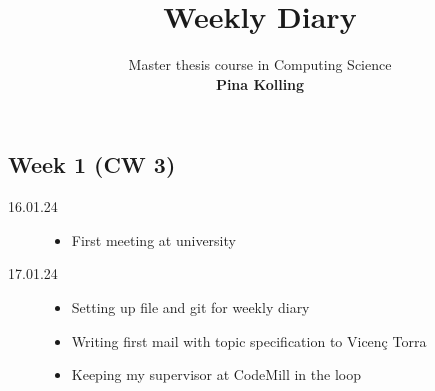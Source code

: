 \documentclass[a4]{scrartcl}
\begin{document}
	
	\title{\vspace{-5ex} Weekly Diary}
	\author{
		Master thesis course in Computing Science \\
		\textbf{Pina Kolling}
	}
	\date{\vspace{-5ex}}
	
	\maketitle
	

	\subsection*{Week 1 (CW 3)}
	
	\begin{description}
		
		\item[16.01.24] 
		
		\begin{itemize}
			\item First meeting at university
		\end{itemize}
		
		\item[17.01.24]
		
		\begin{itemize}
			\item Setting up file and git for weekly diary
			\item Writing first mail with topic specification to Vicen\c{c} Torra
			\item Keeping my supervisor at CodeMill in the loop
		\end{itemize}
		
		
	\end{description}
	
	
	
	
	
	
\end{document}
